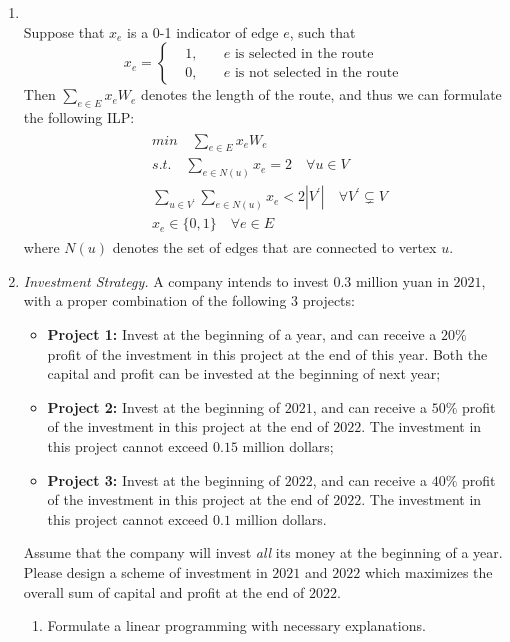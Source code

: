 \documentclass[12pt,a4paper]{article}
\makeatletter
\newtheorem*{solution}{Solution}
\theoremstyle{definition}
\renewenvironment{solution}[1][Solution] {\par\pushQED{\qed}\normalfont\topsep6\p@\@plus6\p@\relax\trivlist\item[\hskip\labelsep\bfseries#1\@addpunct{.}]\ignorespaces}{\popQED\endtrivlist\@endpefalse} \makeatother
\makeatother
\begin{document}
\begin{enumerate}
    \begin{solution}
    ~\\
    Suppose that $x_e$ is a 0-1 indicator of edge $e$, such that
    $$ x_e=\left\{
    \begin{aligned}
    & 1,&\quad \text{$e$ is selected in the route} \\
     & 0,&\quad \text{$e$ is not selected in the route}
    \end{aligned}
    \right.
    $$
    Then $\sum_{e\in E} x_e W_e$ denotes the length of the route, and thus we can formulate the following ILP:
    \begin{align*}
        \begin{split}
        & min \quad \sum_{e\in E} x_e W_e \\
        & s.t.\quad \sum_{e\in N(u)} x_e = 2 \quad \forall u\in V\\
        &\sum_{u\in V^{'}}\sum_{e\in N(u)} x_e < 2|V^{'}| \quad \forall V^{'} \subsetneq V\\
        & x_e \in \{0,1\} \quad \forall e\in E
        \end{split}
    \end{align*}
    where $N(u)$ denotes the set of edges that are connected to vertex $u$.
    \end{solution}
    
    \item
    \textit{Investment Strategy.} A company intends to invest $0.3$ million yuan in $2021$, with a proper combination of the following $3$ projects:
    \begin{itemize}
    \item \textbf{Project 1:} Invest at the beginning of a year, and can receive a $20\%$ profit of the investment in this project at the end of this year. Both the capital and profit can be invested at the beginning of next year;
    \item \textbf{Project 2:} Invest at the beginning of $2021$, and can receive a $50\%$ profit of the investment in this project at the end of $2022$. The investment in this project cannot exceed $0.15$ million dollars;
    \item \textbf{Project 3:} Invest at the beginning of $2022$, and can receive a $40\%$ profit of the investment in this project at the end of $2022$. The investment in this project cannot exceed $0.1$ million dollars.
    \end{itemize}
    Assume that the company will invest \emph{all} its money at the beginning of a year. Please design a scheme of investment in $2021$ and $2022$ which maximizes the overall sum of capital and profit at the end of $2022$.
    \begin{enumerate}
    \item
    Formulate a linear programming with necessary explanations.


\end{enumerate}
\end{enumerate}
\end{document}

